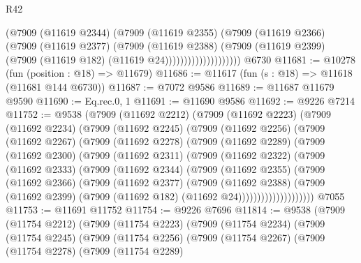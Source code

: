 \begin{lexlean}{R42}
\begin{coremodule}
{                            (@7909
                              (@11619 @2344)
                              (@7909
                                (@11619 @2355)
                                (@7909
                                  (@11619 @2366)
                                  (@7909
                                    (@11619 @2377)
                                    (@7909
                                      (@11619 @2388)
                                      (@7909
                                        (@11619 @2399)
                                        (@7909 (@11619 @182) (@11619 @24))))))))))))))))))))
    @6730
@11681 := @10278 (fun (position : @18) => @11679)
@11686 := @11617 (fun (s : @18) => @11618 (@11681 @144 @6730))
@11687 := @7072 @9586
@11689 := @11687 @11679 @9590
@11690 := Eq.rec.{0, 1}
@11691 := @11690 @9586
@11692 := @9226 @7214
@11752 := @9538
    (@7909
      (@11692 @2212)
      (@7909
        (@11692 @2223)
        (@7909
          (@11692 @2234)
          (@7909
            (@11692 @2245)
            (@7909
              (@11692 @2256)
              (@7909
                (@11692 @2267)
                (@7909
                  (@11692 @2278)
                  (@7909
                    (@11692 @2289)
                    (@7909
                      (@11692 @2300)
                      (@7909
                        (@11692 @2311)
                        (@7909
                          (@11692 @2322)
                          (@7909
                            (@11692 @2333)
                            (@7909
                              (@11692 @2344)
                              (@7909
                                (@11692 @2355)
                                (@7909
                                  (@11692 @2366)
                                  (@7909
                                    (@11692 @2377)
                                    (@7909
                                      (@11692 @2388)
                                      (@7909
                                        (@11692 @2399)
                                        (@7909 (@11692 @182) (@11692 @24))))))))))))))))))))
    @7055
@11753 := @11691 @11752
@11754 := @9226 @7696
@11814 := @9538
    (@7909
      (@11754 @2212)
      (@7909
        (@11754 @2223)
        (@7909
          (@11754 @2234)
          (@7909
            (@11754 @2245)
            (@7909
              (@11754 @2256)
              (@7909
                (@11754 @2267)
                (@7909
                  (@11754 @2278)
                  (@7909
                    (@11754 @2289)
}
\end{coremodule}
\end{lexlean}
